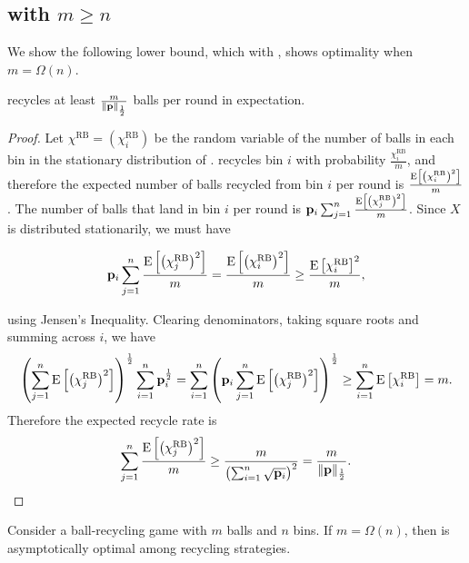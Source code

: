\subsection{\RB with \texorpdfstring{$m \geq n$}{m >= n}}\label{sec:br-randomballwithmanyballs}

We show the following lower bound, which with , shows
optimality when $m = \Omega(n)$.

\begin{lemma}\label{lem:random-ball-lower}
	\RB recycles at least $\frac{m}{\|\mathbf{p}\|_{\frac{1}{2}}}$ balls per round in
	expectation. 
\end{lemma}

\begin{proof}
	Let $\chi^\mathrm{RB}=(\chi_i^\mathrm{RB})$ be the random variable of the
	number of balls in each bin in the stationary distribution of \RB.  \RB
	recycles bin $i$ with probability $\frac{\chi_i^\mathrm{RB}}{m}$, and
	therefore the expected number of balls recycled from bin $i$ per round is
	$\frac{\mathrm{E}\left[\left(\chi_i^\mathrm{RB}\right)^2\right]}{m}$. The number of balls that
	land in bin $i$ per round is
	$\mathbf{p}_i\sum_{j=1}^n\frac{\mathrm{E}\left[\left(\chi_j^\mathrm{RB}\right)^2\right]}{m}$.  Since
	$X$ is distributed stationarily, we must have

	\begin{equation*}
		\mathbf{p}_i\sum_{j=1}^n\frac{\mathrm{E}\left[\left(\chi_j^\mathrm{RB}\right)^2\right]}{m}
	= \frac{\mathrm{E}\left[\left(\chi_i^\mathrm{RB}\right)^2\right]}{m} \geq \frac{\mathrm{E}\left[\chi_i^\mathrm{RB}\right]^2}{m},
	\end{equation*}

	using Jensen's Inequality. Clearing denominators, taking square roots and
	summing across $i$, we have
        \[ \left(\sum_{j=1}^n \mathrm{E}\left[\left(\chi_j^\mathrm{RB}\right)^2\right]\right)^{\frac{1}{2}} \sum_{i=1}^n \mathbf{p}_i^\frac{1}{2}
        = \sum_{i=1}^n \left( \mathbf{p}_i\sum_{j=1}^n {\mathrm{E}\left[\left(\chi_j^\mathrm{RB}\right)^2\right]} \right )^{\frac{1}{2}} \geq \sum_{i=1}^n \mathrm{E}\left[\chi_i^\mathrm{RB}\right] = m. \]
	Therefore the expected recycle rate is
	\[ \sum_{j=1}^n \frac{\mathrm{E}\left[\left(\chi_j^\mathrm{RB}\right)^2\right]}{m}
	\geq \frac{m}{\left(\sum_{i=1}^n \sqrt{\mathbf{p}_i}\right)^2}
	= \frac{m}{\|\mathbf{p}\|_{\frac{1}{2}}}. \]
\end{proof}

\begin{corollary}\label{cor:rboptmanyballs}
	Consider a ball-recycling game with $m$ balls and $n$ bins.  If $m =
	\Omega(n)$, then \RB is asymptotically optimal among recycling strategies. 
\end{corollary}

